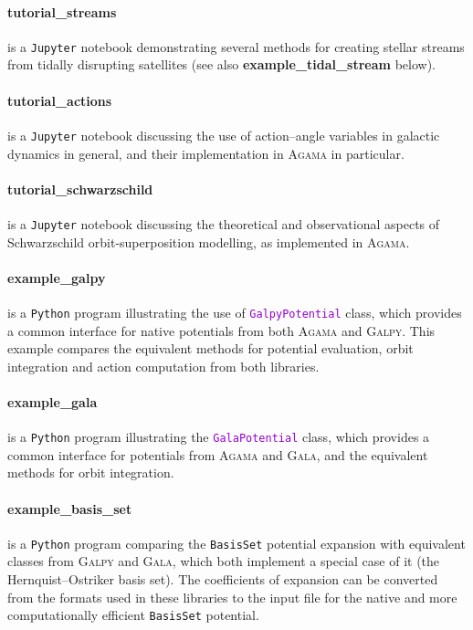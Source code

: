 \documentclass[12pt]{article}
\newcommand{\Agama}{\textsc{Agama}\xspace}
\newcommand{\Galpy}{\textsc{Galpy}\xspace}
\newcommand{\Gala} {\textsc{Gala}\xspace}
\newcommand{\Python}{\texttt{Python}\xspace}
\newcommand{\ttt}[1]{\textcolor{darkviolet}{\texttt{#1}}}
\newcommand{\ppp}[1]{\textcolor{darkolive} {\texttt{#1}}}
\let\oldparagraph\paragraph
\renewcommand{\paragraph}[1]{\vspace{-2mm}\oldparagraph{#1}}
\begin{document}
\paragraph{tutorial_streams} is a \texttt{Jupyter} notebook demonstrating several methods for creating stellar streams from tidally disrupting satellites (see also \textbf{example_tidal_stream} below).

\paragraph{tutorial_actions} is a \texttt{Jupyter} notebook discussing the use of action--angle variables in galactic dynamics in general, and their implementation in \Agama in particular.

\paragraph{tutorial_schwarzschild} is a \texttt{Jupyter} notebook discussing the theoretical and observational aspects of Schwarzschild orbit-superposition modelling, as implemented in \Agama.

\paragraph{example_galpy} is a \Python program illustrating the use of \ttt{GalpyPotential} class, which provides a common interface for native potentials from both \Agama and \Galpy. This example compares the equivalent methods for potential evaluation, orbit integration and action computation from both libraries.

\paragraph{example_gala} is a \Python program illustrating the \ttt{GalaPotential} class, which provides a common interface for potentials from \Agama and \Gala, and the equivalent methods for orbit integration.

\paragraph{example_basis_set} is a \Python program comparing the \ppp{BasisSet} potential expansion with equivalent classes from \Galpy and \Gala, which both implement a special case of it (the Hernquist--Ostriker basis set). The coefficients of expansion can be converted from the formats used in these libraries to the input file for the native and more computationally efficient \ppp{BasisSet} potential.
\end{document}

